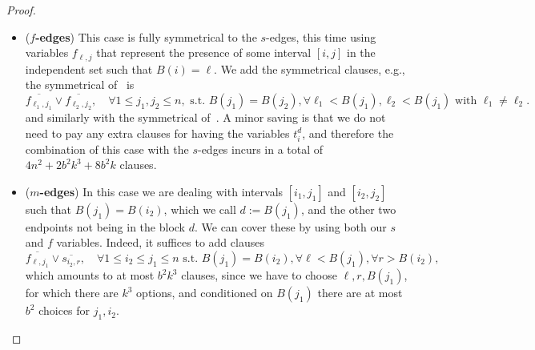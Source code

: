 \documentclass[11pt]{article}
\begin{document}
\begin{proof}
\begin{itemize}
       \item (\textbf{$f$-edges})  This case is fully symmetrical to the $s$-edges, this time using variables $f_{\ell, j}$ that represent the presence of some interval $[i, j]$ in the independent set such that $B(i) = \ell$.
       We add the symmetrical clauses, e.g., the symmetrical of~ is
    \[
       \overline{f_{\ell_1, j_1}} \lor \overline{f_{\ell_2, j_2}}, \quad \forall 1 \leq j_1, j_2 \leq n, \text{ s.t. } B(j_1) = B(j_2), \forall \ell_1 < B(j_1), \ell_2 < B(j_1) \text{ with } \ell_1 \neq \ell_2.    
       \]
       and similarly with the symmetrical of~. A minor saving is that we do not need to pay any extra clauses for having the variables $t^d_{i}$, 
       and therefore the combination of this case with the $s$-edges incurs in a total of $4n^2 + 2b^2 k^3 + 8b^2 k$ clauses. 
        \item (\textbf{$m$-edges}) In this case we are dealing with intervals $[i_1, j_1]$ and $[i_2, j_2]$ such that $B(j_1) = B(i_2)$, which we call $d := B(j_1)$, and the other two endpoints not being in the block $d$. We can cover these by using both our $s$ and $f$ variables.
       Indeed, it suffices to add clauses 
       \begin{equation}
        \overline{f_{\ell, j_1}} \lor \overline{s_{i_2, r}}, \quad \forall 1 \leq i_2 \leq j_1 \leq n \text{ s.t. } B(j_1) = B(i_2), \forall \ell < B(j_1), \forall r > B(i_2),
       \end{equation}
       which amounts to at most $b^2 k^3$ clauses, since we have to choose $\ell, r, B(j_1)$, for which there are $k^3$ options, and conditioned on $B(j_1)$ there are at most $b^2$ choices for $j_1, i_2$.
    \end{itemize}


\end{proof}
\end{document}
